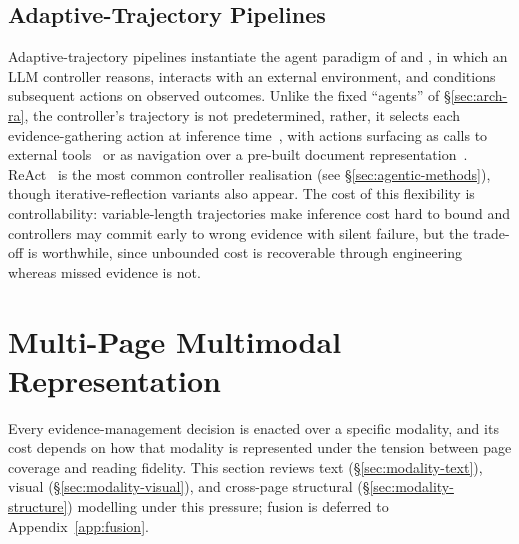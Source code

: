 \documentclass[11pt]{article}
\begin{document}
\subsection{Adaptive-Trajectory Pipelines}
\label{sec:arch-agent}
Adaptive-trajectory pipelines instantiate the agent paradigm of \citeauthor{plaat2025agentic} and \citeauthor{wang2024survey}, in which an LLM controller reasons, interacts with an external environment, and conditions subsequent actions on observed outcomes. Unlike the fixed ``agents'' of \S\ref{sec:arch-ra}, the controller's trajectory is not predetermined, rather, it selects each evidence-gathering action at inference time~\cite{zheng2026docvstar, sun2025docagent}, with actions surfacing as calls to external tools~\cite{wang2025vidorag, yu2025mact} or as navigation over a pre-built document representation~\cite{jain2025simpledoc, fu2026dmap}. ReAct~\cite{yao2022react} is the most common controller realisation (see \S\ref{sec:agentic-methods}), though iterative-reflection variants also appear. The cost of this flexibility is controllability: variable-length trajectories make inference cost hard to bound and controllers may commit early to wrong evidence with silent failure, but the trade-off is worthwhile, since unbounded cost is recoverable through engineering whereas missed evidence is not.


\section{Multi-Page Multimodal Representation}
\label{sec:modality}
Every evidence-management decision is enacted over a specific modality, and its cost depends on how that modality is represented under the tension between page coverage and reading fidelity. This section reviews text (\S\ref{sec:modality-text}), visual (\S\ref{sec:modality-visual}), and cross-page structural (\S\ref{sec:modality-structure}) modelling under this pressure; fusion is deferred to Appendix~\ref{app:fusion}.
\end{document}
